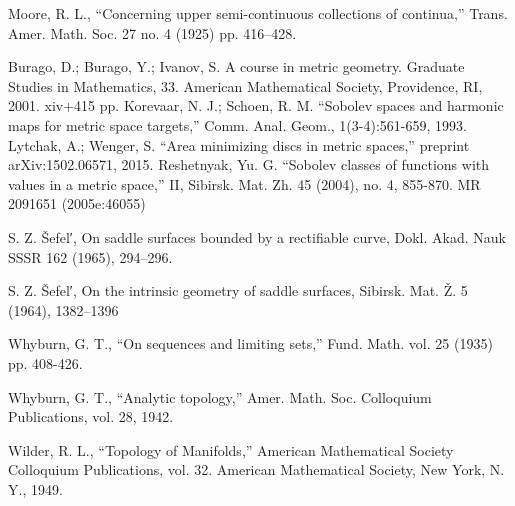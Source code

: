 \documentclass[a4paper,10pt]{amsart}
\begin{document}
\begin{thebibliography}{52}
Moore, R. L.,
``Concerning upper semi-continuous collections of continua,''
Trans. Amer. Math. Soc. 27 no. 4 (1925) pp. 416--428.

Burago, D.; Burago, Y.; Ivanov, S.
A course in metric geometry.
Graduate Studies in Mathematics, 33. American Mathematical Society, Providence, RI, 2001. xiv+415 pp.
Korevaar, N. J.; Schoen, R. M. ``Sobolev spaces and harmonic maps for metric space targets,'' Comm. Anal. Geom., 1(3-4):561-659, 1993.
Lytchak, A.; Wenger, S. ``Area minimizing discs in metric spaces,'' preprint arXiv:1502.06571, 2015.
Reshetnyak, Yu. G. ``Sobolev classes of functions with values in a metric space,'' II, Sibirsk. Mat. Zh. 45 (2004), no. 4, 855-870. MR 2091651 (2005e:46055)

 S. Z. \v{S}efel′, On saddle surfaces bounded by a rectifiable curve, Dokl. Akad. Nauk SSSR 162 (1965), 294--296.

 S. Z. \v{S}efel′, On the intrinsic geometry of saddle surfaces, Sibirsk. Mat. Ž. 5 (1964), 1382--1396

Whyburn, G. T., ``On sequences and limiting sets,'' Fund. Math. vol. 25 (1935) pp. 408-426.

Whyburn, G. T., ``Analytic topology,'' Amer. Math. Soc. Colloquium Publications, vol. 28, 1942.

Wilder, R. L., ``Topology of Manifolds,'' American Mathematical Society Colloquium Publications, vol. 32. American Mathematical
Society, New York, N. Y., 1949.
\end{thebibliography}
\end{document}
